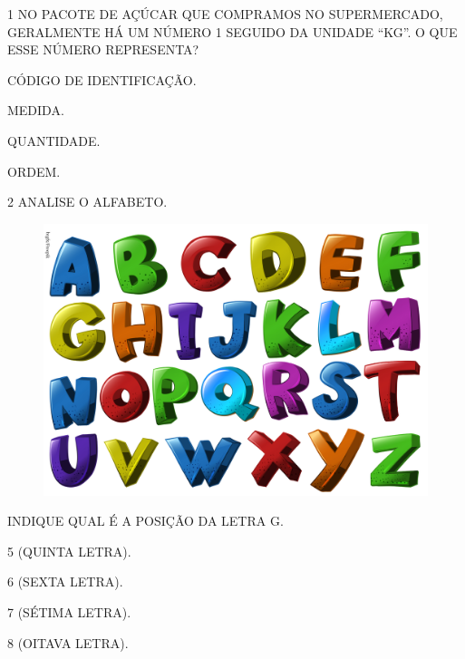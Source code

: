 \pagebreak

\num{1} NO PACOTE DE AÇÚCAR QUE COMPRAMOS NO SUPERMERCADO, GERALMENTE HÁ UM NÚMERO
1 SEGUIDO DA UNIDADE ``KG''. O QUE ESSE NÚMERO REPRESENTA?

\begin{escolha}
\item CÓDIGO DE IDENTIFICAÇÃO.

\item MEDIDA.

\item QUANTIDADE.

\item ORDEM.
\end{escolha}

\num{2} ANALISE O ALFABETO.


\begin{figure}[H]
\centering
\includegraphics[width=.8\textwidth]{./media/SAEB_1ANO_MAT_FIGURA112.png}
\end{figure}

INDIQUE QUAL É A POSIÇÃO DA LETRA G.

\begin{escolha}
\item 5 (QUINTA LETRA).

\item 6 (SEXTA LETRA).

\item 7 (SÉTIMA LETRA).

\item 8 (OITAVA LETRA).
\end{escolha}


